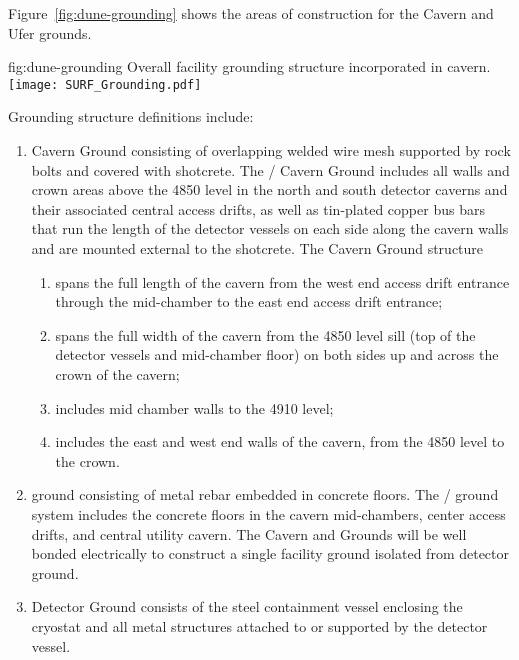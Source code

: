 Figure~\ref{fig:dune-grounding} shows the areas of construction for the Cavern and Ufer grounds.
\begin{dunefigure}{fig:dune-grounding}
  {Overall  facility grounding structure incorporated in cavern.}
  \texttt{[image: SURF\_Grounding.pdf]}
\end{dunefigure}
Grounding structure definitions include:
\begin{enumerate}
 \item Cavern Ground consisting of overlapping welded wire mesh
   supported by rock bolts and covered with shotcrete. The
   / Cavern Ground includes all walls and
   crown areas above the 4850 level in the north and south detector
   caverns and their associated central access drifts, as well as tin-plated
   copper bus bars that run the length of the detector vessels
   on each side along the cavern walls and are mounted external to the
   shotcrete.  The Cavern Ground structure
\begin{enumerate}
 \item spans the full length of the cavern from the west end access
   drift entrance through the mid-chamber to the east end access drift
   entrance;
 \item spans the full width of the cavern from the 4850 level sill
   (top of the detector vessels and mid-chamber floor) on both sides
   up and across the crown of the cavern;
 \item includes mid chamber walls to the 4910 level;
 \item includes the east and west end walls of the cavern, from the
   4850 level to the crown.
\end{enumerate}
 \item {} ground consisting of metal rebar embedded in
   concrete floors. The /  ground
   system includes the concrete floors in the cavern mid-chambers,
   center access drifts, and central utility cavern. The Cavern and
    Grounds will be well bonded electrically to construct
   a single facility ground isolated from detector ground.
 \item Detector Ground consists of the steel containment vessel
   enclosing the cryostat and all metal structures attached to or
   supported by the detector vessel.
\end{enumerate}


